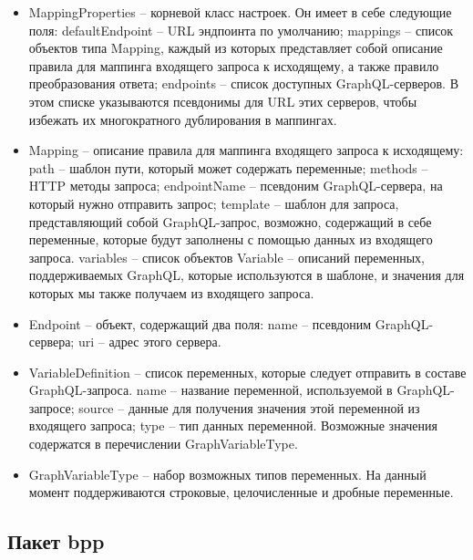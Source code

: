 \begin{itemize}
	\item MappingProperties -- корневой класс настроек.
	Он имеет в себе следующие поля:
		\subitem defaultEndpoint -- URL эндпоинта по умолчанию;
		\subitem mappings -- список объектов типа Mapping, каждый из которых представляет собой описание правила для маппинга входящего запроса к исходящему, а также правило преобразования ответа;
		\subitem endpoints -- список доступных GraphQL-серверов.
		В этом списке указываются псевдонимы для URL этих серверов, чтобы избежать их многократного дублирования в маппингах.

	\item Mapping -- описание правила для маппинга входящего запроса к исходящему:
		\subitem path -- шаблон пути, который может содержать переменные;
		\subitem methods -- HTTP методы запроса;
		\subitem endpointName -- псевдоним GraphQL-сервера, на который нужно отправить запрос;
		\subitem template -- шаблон для запроса, представляющий собой GraphQL-запрос, возможно, содержащий в себе переменные, которые будут заполнены с помощью данных из входящего запроса.
		\subitem variables -- список объектов Variable -- описаний переменных, поддерживаемых GraphQL, которые используются в шаблоне, и значения для которых мы также получаем из входящего запроса.

	\item Endpoint -- объект, содержащий два поля:
		\subitem name -- псевдоним GraphQL-сервера;
		\subitem uri -- адрес этого сервера.

	\item VariableDefinition -- список переменных, которые следует отправить в составе GraphQL-запроса.
		\subitem name -- название переменной, используемой в GraphQL-запросе;
		\subitem source -- данные для получения значения этой переменной из входящего запроса;
		\subitem type -- тип данных переменной.
			Возможные значения содержатся в перечислении GraphVariableType.

	\item GraphVariableType -- набор возможных типов переменных.
		На данный момент поддерживаются строковые, целочисленные и дробные переменные.

\end{itemize}

\subsection{Пакет bpp}\label{subsec:package-bpp}

